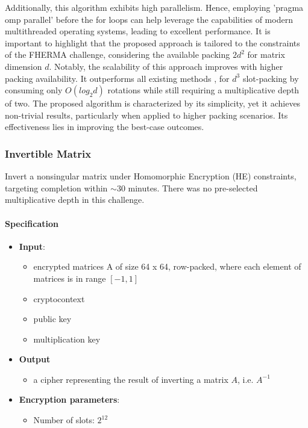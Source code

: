 \documentclass[article]{iacrtrans}
\begin{document}
Additionally, this algorithm exhibits high parallelism. Hence, employing 'pragma omp parallel' before the for loops can help leverage the capabilities of modern multithreaded operating systems, leading to excellent performance. It is important to highlight that the proposed approach is tailored to the constraints of the FHERMA challenge, considering the available packing $2d^2$ for matrix dimension $d$. Notably, the scalability of this approach improves with higher packing availability. It outperforms all existing methods \cite{rt22},\cite{jkls18} for $d^3$ slot-packing by consuming only $O(log_2d)$ rotations while still requiring a multiplicative depth of two. The proposed algorithm is characterized by its simplicity, yet it achieves non-trivial results, particularly when applied to higher packing scenarios. Its effectiveness lies in improving the best-case outcomes.  

\subsubsection{Invertible Matrix}
  Invert a nonsingular matrix under Homomorphic Encryption (HE) constraints, targeting completion within $\sim$30 minutes. There was no pre-selected multiplicative depth in this challenge.

\paragraph{Specification}
\begin{itemize}
    \item \textbf{Input}: 
        \begin{itemize}
            \item encrypted matrices A of size  64 x 64, row-packed, where each element of matrices is in range $[-1, 1]$
            \item cryptocontext
            \item public key
            \item multiplication key
        \end{itemize}
    \item \textbf{Output}
        \begin{itemize}
            \item a cipher representing the result of inverting a matrix $A$, i.e. $A^{-1}$
        \end{itemize}
    \item \textbf{Encryption parameters}:
        \begin{itemize}
            \item Number of slots: $2^{12}$ 
        \end{itemize}
\end{itemize} 
\end{document}
